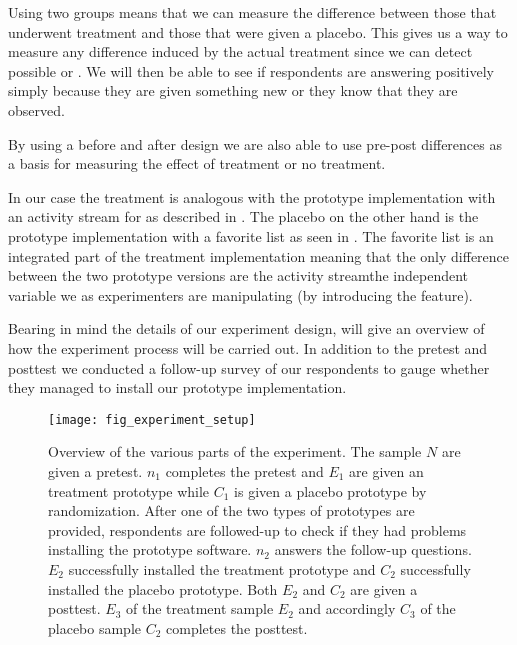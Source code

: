 Using two groups means that we can measure the difference between those that
underwent treatment and those that were given a placebo. This gives us a way
to measure any difference induced by the actual treatment since we can detect
possible  or .
We will then be able to see if respondents are answering positively simply
because they are given something new or they know that they are observed.

By using a before and after design we are also able to use pre-post
differences as a basis for measuring the effect of treatment or no
treatment.



In our case the treatment is analogous with the prototype implementation with
an activity stream for \urort{} as described in
.
The placebo on the other hand is the 
prototype implementation with a favorite list as seen in
.
The favorite list is an integrated part of the treatment implementation
meaning that the only difference between the two prototype versions are
the activity stream\dash{}the independent variable we as experimenters are
manipulating (by introducing the feature).

Bearing in mind the details of our experiment design,
 will give an overview of how the experiment
process will be carried out. In addition to the pretest and posttest we
conducted a follow-up survey of our respondents to gauge whether they managed
to install our prototype implementation.

\begin{figure}
  \texttt{[image: fig\_experiment\_setup]}
  \caption[Experiment Overview]{
    Overview of the various parts of the experiment. The sample $N$
    are given a pretest. $n_1$ completes the pretest and $E_1$ are given
    an treatment prototype while $C_1$ is given a placebo
    prototype by randomization.
    After one of the two types of prototypes are provided, respondents are
    followed-up to check if they had problems installing the prototype
    software. $n_2$ answers the follow-up questions.
    $E_2$ successfully installed the treatment prototype and $C_2$
    successfully installed the placebo prototype. Both $E_2$ and $C_2$ are
    given a posttest.
    $E_3$ of the treatment sample $E_2$ and accordingly $C_3$ of the
    placebo sample $C_2$ completes the posttest.
  }
  \label{figure:fig.experiment.setup}
\end{figure}

